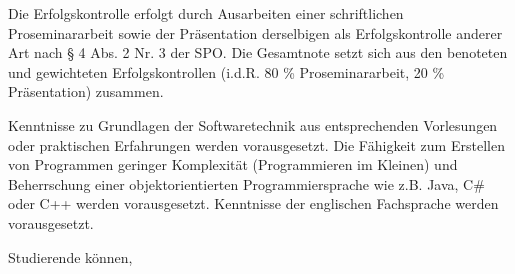 \begin{course}

\setdoclanguagegerman
{}



\coursehead


\label{cour_7351.dp_997}


\begin{styleenv}
\begin{assessment}
Die Erfolgskontrolle erfolgt durch Ausarbeiten einer schriftlichen Proseminararbeit sowie der Präsentation derselbigen als Erfolgskontrolle anderer Art nach § 4 Abs. 2 Nr. 3 der SPO. Die Gesamtnote setzt sich aus den benoteten und gewichteten Erfolgskontrollen (i.d.R. 80 \% Proseminararbeit, 20 \% Präsentation) zusammen.


\end{assessment}

\begin{conditions}Kenntnisse zu Grundlagen der Softwaretechnik aus entsprechenden Vorlesungen oder praktischen Erfahrungen werden vorausgesetzt.\newline
\newline
Die Fähigkeit zum Erstellen von Programmen geringer Komplexität (Programmieren im Kleinen) und Beherrschung einer objektorientierten Programmiersprache wie z.B. Java, C\# oder C++ werden vorausgesetzt.\newline
\newline
Kenntnisse der englischen Fachsprache werden vorausgesetzt.

\end{conditions}


\end{styleenv}

\begin{learningoutcomes}
Studierende können,


\end{learningoutcomes}
\end{course}
